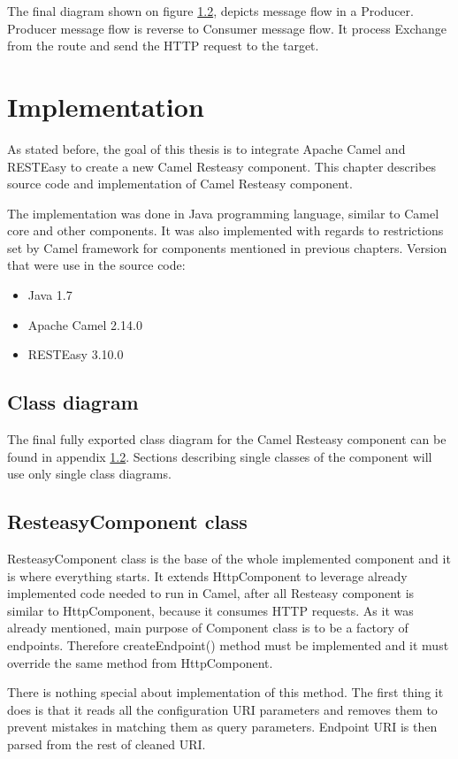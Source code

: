 \documentclass[12pt,final,oneside]{fithesis2}
\begin{document}
The final diagram shown on figure \ref{}, depicts message flow in a Producer. Producer message flow is reverse to Consumer message flow. It process Exchange from the route and send the HTTP request to the target. 


\chapter{Implementation}
As stated before, the goal of this thesis is to integrate Apache Camel and RESTEasy to create a new Camel Resteasy component. This chapter describes source code and implementation of Camel Resteasy component. 

The implementation was done in Java programming language, similar to Camel core and other components. It was also implemented with regards to restrictions set by Camel framework for components mentioned in previous chapters. Version that were use in the source code:
\begin{itemize}
\item
Java 1.7

\item
Apache Camel 2.14.0

\item
RESTEasy 3.10.0
\end{itemize}

\section{Class diagram}
The final fully exported class diagram for the Camel Resteasy component can be found in appendix \ref{}. Sections describing single classes of the component will use only single class diagrams.

\section{ResteasyComponent class}
ResteasyComponent class is the base of the whole implemented component and it is where everything starts. It extends HttpComponent to leverage already implemented code needed to run in Camel, after all Resteasy component is similar to HttpComponent, because it consumes HTTP requests. As it was already mentioned, main purpose of Component class is to be a factory of endpoints. Therefore createEndpoint() method must be implemented and it must override the same method from HttpComponent.

There is nothing special about implementation of this method. The first thing it does is that it reads all the configuration URI parameters and removes them to prevent mistakes in matching them as query parameters. Endpoint URI is then parsed from the rest of cleaned URI.
\end{document}
